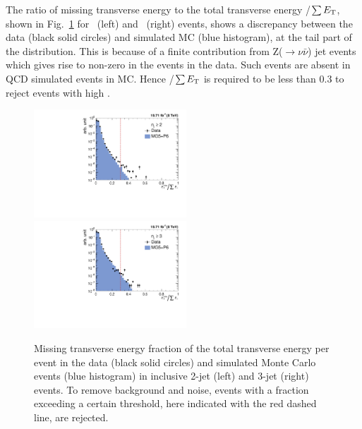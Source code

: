 The ratio of missing transverse energy to the total transverse energy \ETmiss/$\sum E_{\mathrm{T}}$, shown in Fig.~\ref{fig:metcut} for \njt~(left) and \njth~(right) events, shows a discrepancy between the data (black solid circles) and simulated MC (blue histogram), at the tail part of the distribution. This is because of a finite contribution from Z($\rightarrow \nu \bar{\nu}$) \plus jet events which gives rise to non-zero \ET in the events in the data. Such events are absent in QCD simulated events in MC. Hence \ETmiss/$\sum E_{\mathrm{T}}$ is required to be less than 0.3 to reject events with high \ETmiss.

\begin{figure}[!htbp]
\centering
 \hspace*{-2mm}\includegraphics[width=0.51\textwidth]{Plots_HT_2_150/Missing_ET_2.pdf}%
 ~~\includegraphics[width=0.51\textwidth]{Plots_HT_2_150/Missing_ET_3.pdf}
 \caption[Missing transverse energy fraction of the total transverse energy per event in the data and simulated Monte Carlo events.]{Missing transverse energy fraction of the total transverse energy per event in the data (black solid circles) and simulated Monte Carlo events (blue histogram) in inclusive 2-jet (left) and 3-jet (right) events. To remove background and noise, events with a fraction exceeding a certain threshold, here indicated with the red dashed line, are rejected.}
 \label{fig:metcut}
\end{figure} 

